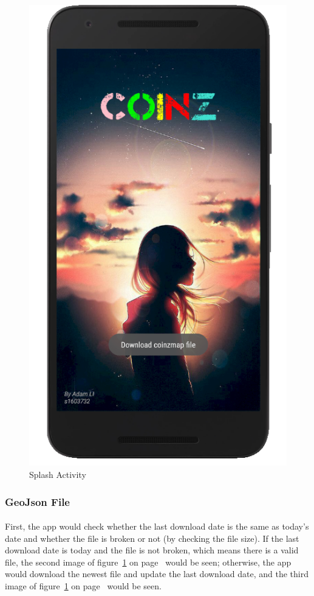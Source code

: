 \documentclass[12pt]{article}
\begin{document}
\begin{figure}
	\includegraphics[scale=0.25]{SplashActivityNoFile.png}
	\caption{\label{fig:splash}Splash Activity}
\end{figure}
\subsubsection{GeoJson File}
\paragraph{}
First, the app would check whether the last download date is the same as today's date and whether the file is broken or not (by checking the file size). If the last download date is today and the file is not broken, which means there is a valid file, the second image of figure~\ref{fig:splash} on page~\pageref{fig:splash} would be seen; otherwise, the app would download the newest file and update the last download date, and the third image of figure~\ref{fig:splash} on page~\pageref{fig:splash} would be seen.
\end{document}
